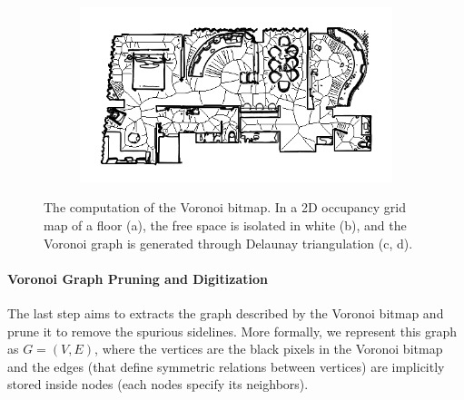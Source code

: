 \begin{figure}[h!]
\begin{subfigure}[b]{0.49\linewidth}
		\caption{}
		\label{fig:pose_estimator_voronoi_bitmap}
	\end{subfigure}
	\hfil
	\begin{subfigure}[b]{0.49\linewidth}
		\centering
		\includegraphics[width=\textwidth]{images/pose_estimator_bitmap_map.png}
		\caption{}
		\label{fig:pose_estimator_voronoi_bitmap_map}
	\end{subfigure}
	\caption{The computation of the Voronoi bitmap. In a 2D occupancy grid map of a floor (a), the free space is isolated in white (b), and the Voronoi graph is generated through Delaunay triangulation (c, d).}
	\label{fig:pose_estimator}
\end{figure}

\paragraph{Voronoi Graph Pruning and Digitization} The last step aims to extracts the graph described by the Voronoi bitmap and prune it to remove the spurious sidelines. More formally, we represent this graph as $G = (V, E)$, where the vertices are the black pixels in the Voronoi bitmap and the edges (that define symmetric relations between vertices) are implicitly stored inside nodes (each nodes specify its neighbors). 

